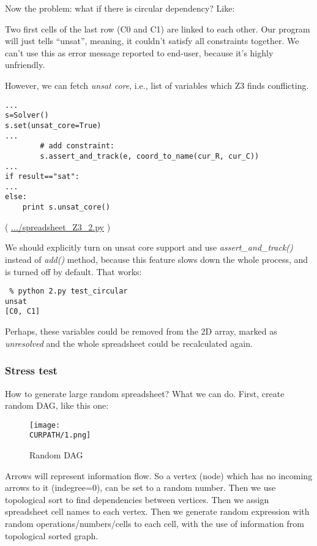 Now the problem: what if there is circular dependency? Like:



Two first cells of the last row (C0 and C1) are linked to each other.
Our program will just tells ``unsat'', meaning, it couldn't satisfy all constraints together.
We can't use this as error message reported to end-user, because it's highly unfriendly.

However, we can fetch \textit{unsat core}, i.e., list of variables which Z3 finds conflicting.

\begin{lstlisting}
...
s=Solver()
s.set(unsat_core=True)
...
        # add constraint:
        s.assert_and_track(e, coord_to_name(cur_R, cur_C))
...
if result=="sat":
...
else:
    print s.unsat_core()
\end{lstlisting}

( \url{.../spreadsheet_Z3_2.py} )

We should explicitly turn on unsat core support and use \textit{assert\_and\_track()} instead of \textit{add()} method,
because this feature slows down the whole process, and is turned off by default.
That works:

\begin{lstlisting}
 % python 2.py test_circular
unsat
[C0, C1]
\end{lstlisting}

Perhaps, these variables could be removed from the 2D array, marked as \textit{unresolved}
and the whole spreadsheet could be recalculated again.

\subsubsection{Stress test}

How to generate large random spreadsheet?
What we can do.
First, create random \ac{DAG}, like this one:

\begin{figure}[H]
\centering
\texttt{[image: \\CURPATH/1.png]}
\caption{Random \ac{DAG}}
\end{figure}

Arrows will represent information flow.
So a vertex (node) which has no incoming arrows to it (indegree=0), can be set to a random number.
Then we use topological sort to find dependencies between vertices.
Then we assign spreadsheet cell names to each vertex.
Then we generate random expression with random operations/numbers/cells to each cell,
with the use of information from topological sorted graph.


